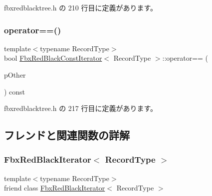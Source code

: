  fbxredblacktree.\+h の 210 行目に定義があります。

\mbox{\label{class_fbx_red_black_const_iterator_a542202e140ed1247bf5af93fdbf09de9}} 
\subsubsection{\texorpdfstring{operator==()}{operator==()}}
{\footnotesize\ttfamily template$<$typename Record\+Type$>$ \\
bool \hyperlink{class_fbx_red_black_const_iterator}{Fbx\+Red\+Black\+Const\+Iterator}$<$ Record\+Type $>$\+::operator== (\begin{DoxyParamCaption}\item[{const \hyperlink{class_fbx_red_black_const_iterator}{Fbx\+Red\+Black\+Const\+Iterator}$<$ Record\+Type $>$ \&}]{p\+Other }\end{DoxyParamCaption}) const\hspace{0.3cm}{\ttfamily [inline]}}



 fbxredblacktree.\+h の 217 行目に定義があります。



\subsection{フレンドと関連関数の詳解}
\mbox{\label{class_fbx_red_black_const_iterator_a8615cd7fe43a76938283f1ddbe4f8b9b}} 
\subsubsection{\texorpdfstring{Fbx\+Red\+Black\+Iterator$<$ Record\+Type $>$}{FbxRedBlackIterator< RecordType >}}
{\footnotesize\ttfamily template$<$typename Record\+Type$>$ \\
friend class \hyperlink{class_fbx_red_black_iterator}{Fbx\+Red\+Black\+Iterator}$<$ Record\+Type $>$\hspace{0.3cm}{\ttfamily [friend]}}



